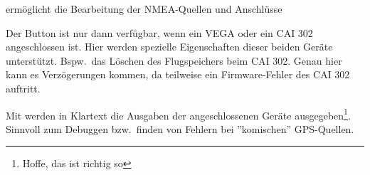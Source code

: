  ermöglicht die Bearbeitung der NMEA-Quellen und Anschlüsse

Der Button  ist nur dann verfügbar, wenn ein VEGA oder ein CAI 302 angeschlossen ist. Hier werden spezielle Eigenschaften dieser beiden Geräte unterstützt.  Bspw.\  das Löschen des Flugspeichers beim CAI 302. \warning Genau hier kann es Verzögerungen kommen, da teilweise ein Firmware-Fehler  des CAI 302 auftritt.

Mit  werden in Klartext die Ausgaben der angeschlossenen Geräte ausgegeben\footnote{Hoffe, das ist richtig so}. Sinnvoll zum Debuggen bzw.\ finden von Fehlern bei ''komischen'' GPS-Quellen.





